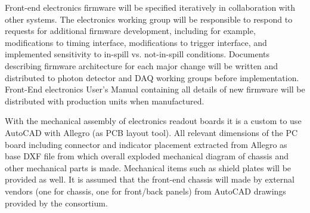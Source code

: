 Front-end electronics firmware will be specified iteratively in collaboration with other systems. The electronics working group will be responsible to respond to requests for additional firmware development, including for example, modifications to timing interface, modifications to trigger interface, and implemented sensitivity to in-spill vs. not-in-spill conditions. Documents describing firmware architecture for each major change will be written and distributed to photon detector and DAQ working groups before implementation. Front-End electronics User's Manual containing all details of new firmware will be distributed with production units when manufactured.

With the mechanical assembly of electronics readout boards it is a custom to use  AutoCAD with Allegro (as PCB layout tool). All relevant dimensions of the PC board including connector and indicator placement extracted from Allegro as base DXF file from which overall exploded mechanical diagram of chassis and other mechanical parts is made. Mechanical items such as shield plates will be provided as well. It is assumed that the front-end chassis will made by external vendors (one for chassis, one for front/back panels) from AutoCAD drawings provided by the consortium.



